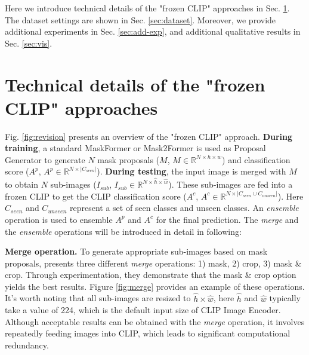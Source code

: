 
Here we introduce technical details of the "frozen CLIP" approaches in Sec. \ref{sec:frozen CLIP}. The dataset settings are shown in Sec. \ref{sec:dataset}.
Moreover, we provide additional experiments in Sec. \ref{sec:add-exp}, and additional qualitative results in Sec. \ref{sec:vis}.


\section{Technical details of the "frozen CLIP" approaches}
\label{sec:frozen CLIP}   



Fig. \ref{fig:revision}  presents an overview of the "frozen CLIP" approach. 
\textbf{During training}, a standard MaskFormer or Mask2Former is used as Proposal Generator to generate $N$ mask proposals ($M$, $M  \in \mathbb{R}^{N \times h \times w}$) and classification score ($A^p$, $A^p \in \mathbb{R}^{N \times |C_{seen}|}$).
\textbf{During testing}, the input image is merged with $M$ to obtain $N$ sub-images ($I_{sub}$, $I_{sub} \in \mathbb{R}^{N \times \hat{h} \times \hat{w}}$). These sub-images are fed into a frozen CLIP to get the CLIP classification score ($A^c$, $A^c \in \mathbb{R}^{N \times |C_{seen}\cup C_{unseen}|}$). Here $C_{seen}$ and $C_{unseen}$ represent a set of seen classes and unseen classes. An \textit{ensemble} operation is used to ensemble $A^p$ and $A^c$ for the final prediction. The \textit{merge} and the \textit{ensemble} operations will be introduced in detail in following:

\noindent \textbf{Merge operation.}
To generate appropriate sub-images based on mask proposals, \cite{zegformer} presents three different \textit{merge} operations: 1) mask, 2) crop, 3) mask $\&$ crop. Through experimentation, they demonstrate that the mask $\&$ crop option yields the best results. Figure \ref{fig:merge} provides an example of these operations. It's worth noting that all sub-images are resized to $\hat{h} \times \hat{w}$, here $\hat{h}$ and $\hat{w}$ typically take a value of 224, which is the default input size of CLIP Image Encoder. Although acceptable results can be obtained with the \textit{merge} operation, it involves repeatedly feeding images into CLIP, which leads to significant computational redundancy.

